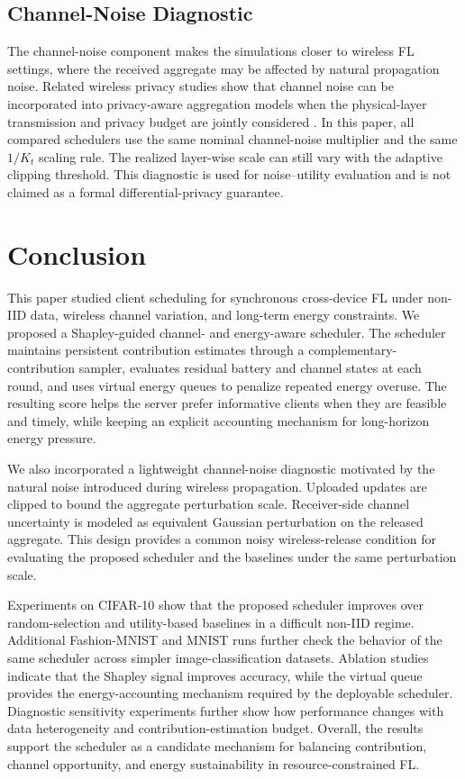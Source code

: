 \documentclass[journal]{IEEEtran}
\begin{document}
\subsection{Channel-Noise Diagnostic}

The channel-noise component makes the simulations closer to wireless FL settings, where the received aggregate may be affected by natural propagation noise. Related wireless privacy studies show that channel noise can be incorporated into privacy-aware aggregation models when the physical-layer transmission and privacy budget are jointly considered \cite{yan2023otafedavgprivacy}. In this paper, all compared schedulers use the same nominal channel-noise multiplier and the same $1/K_t$ scaling rule. The realized layer-wise scale can still vary with the adaptive clipping threshold. This diagnostic is used for noise--utility evaluation and is not claimed as a formal differential-privacy guarantee.

\section{Conclusion}
\label{sec:conclusion}

This paper studied client scheduling for synchronous cross-device FL under non-IID data, wireless channel variation, and long-term energy constraints. We proposed a Shapley-guided channel- and energy-aware scheduler. The scheduler maintains persistent contribution estimates through a complementary-contribution sampler, evaluates residual battery and channel states at each round, and uses virtual energy queues to penalize repeated energy overuse. The resulting score helps the server prefer informative clients when they are feasible and timely, while keeping an explicit accounting mechanism for long-horizon energy pressure.

We also incorporated a lightweight channel-noise diagnostic motivated by the natural noise introduced during wireless propagation. Uploaded updates are clipped to bound the aggregate perturbation scale. Receiver-side channel uncertainty is modeled as equivalent Gaussian perturbation on the released aggregate. This design provides a common noisy wireless-release condition for evaluating the proposed scheduler and the baselines under the same perturbation scale.

Experiments on CIFAR-10 show that the proposed scheduler improves over random-selection and utility-based baselines in a difficult non-IID regime. Additional Fashion-MNIST and MNIST runs further check the behavior of the same scheduler across simpler image-classification datasets. Ablation studies indicate that the Shapley signal improves accuracy, while the virtual queue provides the energy-accounting mechanism required by the deployable scheduler. Diagnostic sensitivity experiments further show how performance changes with data heterogeneity and contribution-estimation budget. Overall, the results support the scheduler as a candidate mechanism for balancing contribution, channel opportunity, and energy sustainability in resource-constrained FL.
\end{document}
